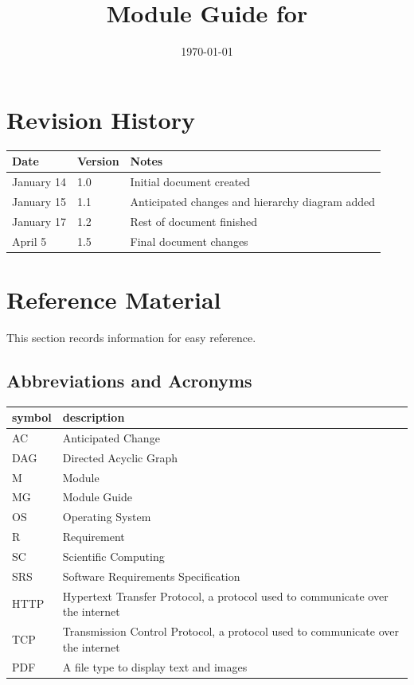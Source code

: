 \documentclass[12pt, titlepage]{article}
\begin{document}
	
	\title{Module Guide for \progname{}} 
	\author{\authname}
	\date{\today}
	
	\maketitle
	
	
	\section{Revision History}
	
	\begin{tabularx}{\textwidth}{p{3cm}p{2cm}X}
		\toprule {\bf Date} & {\bf Version} & {\bf Notes}\\
		\midrule
		January 14 & 1.0 & Initial document created\\
		January 15 & 1.1 & Anticipated changes and hierarchy diagram added\\
		January 17 & 1.2 & Rest of document finished\\
		April 5 & 1.5 & Final document changes \\
		\bottomrule
	\end{tabularx}
	
	\newpage
	
	\section{Reference Material}
	
	This section records information for easy reference.
	
	\subsection{Abbreviations and Acronyms}
	
	\renewcommand{\arraystretch}{1.2}
	\begin{tabular}{l l} 
		\toprule		
		\textbf{symbol} & \textbf{description}\\
		\midrule 
		AC & Anticipated Change\\
		DAG & Directed Acyclic Graph \\
		M & Module \\
		MG & Module Guide \\
		OS & Operating System \\
		R & Requirement\\
		SC & Scientific Computing \\
		SRS & Software Requirements Specification\\
		HTTP & Hypertext Transfer Protocol, a protocol used to communicate over the internet\\
		TCP & Transmission Control Protocol, a protocol used to communicate over the internet\\
		PDF & A file type to display text and images\\
		\bottomrule
	\end{tabular}\\
	
\end{document}
